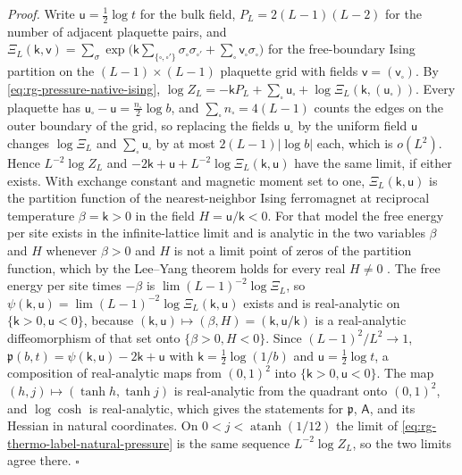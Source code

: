 \noindent\emph{Proof.}
Write $\mathsf u=\tfrac12\log t$ for the bulk field, $P_L=2(L-1)(L-2)$ for
the number of adjacent plaquette pairs, and
$\Xi_L(\mathsf k,\mathsf v)=\sum_\sigma\exp\bigl(\mathsf k\sum_{\{\square,\square'\}}
\sigma_\square\sigma_{\square'}+\sum_\square\mathsf v_\square\sigma_\square\bigr)$
for the free-boundary Ising partition on the $(L-1)\times(L-1)$ plaquette
grid with fields $\mathsf v=(\mathsf v_\square)$. By
\cref{eq:rg-pressure-native-ising},
$\log Z_L=-\mathsf kP_L+\sum_\square\mathsf u_\square+\log\Xi_L(\mathsf k,(\mathsf u_\square))$.
Every plaquette has $\mathsf u_\square-\mathsf u=\tfrac{n_\square}{2}\log b$,
and $\sum_\square n_\square=4(L-1)$ counts the edges on the outer boundary
of the grid, so replacing the fields $\mathsf u_\square$ by the uniform
field $\mathsf u$ changes $\log\Xi_L$ and $\sum_\square\mathsf u_\square$ by at
most $2(L-1)\lvert\log b\rvert$ each, which is $o(L^2)$. Hence
$L^{-2}\log Z_L$ and
$-2\mathsf k+\mathsf u+L^{-2}\log\Xi_L(\mathsf k,\mathsf u)$ have the same
limit, if either exists. With exchange constant and magnetic moment set to
one, $\Xi_L(\mathsf k,\mathsf u)$ is the partition function of the
nearest-neighbor Ising ferromagnet at reciprocal temperature
$\beta=\mathsf k>0$ in the field $H=\mathsf u/\mathsf k<0$. For that model the
free energy per site exists in the infinite-lattice limit and is analytic
in the two variables $\beta$ and $H$ whenever $\beta>0$ and $H$ is not a
limit point of zeros of the partition function, which by the Lee--Yang
theorem holds for every real $H\neq0$
\citep[abstract and Section~IV]{LebowitzPenrose1968}. The free energy per
site times $-\beta$ is $\lim(L-1)^{-2}\log\Xi_L$, so
$\psi(\mathsf k,\mathsf u)=\lim(L-1)^{-2}\log\Xi_L(\mathsf k,\mathsf u)$
exists and is real-analytic on $\{\mathsf k>0,\mathsf u<0\}$, because
$(\mathsf k,\mathsf u)\mapsto(\beta,H)=(\mathsf k,\mathsf u/\mathsf k)$ is a
real-analytic diffeomorphism of that set onto $\{\beta>0,H<0\}$. Since
$(L-1)^2/L^2\to1$, $\mathfrak p(b,t)=\psi(\mathsf k,\mathsf u)-2\mathsf k+\mathsf u$
with $\mathsf k=\tfrac12\log(1/b)$ and $\mathsf u=\tfrac12\log t$, a
composition of real-analytic maps from $(0,1)^2$ into $\{\mathsf k>0,\mathsf
u<0\}$. The map $(h,j)\mapsto(\tanh h,\tanh j)$ is real-analytic from the
quadrant onto $(0,1)^2$, and $\log\cosh$ is real-analytic, which gives the
statements for $\mathfrak p$, $\mathsf A$, and its Hessian in natural
coordinates. On $0<j<\operatorname{atanh}(1/12)$ the limit of
\cref{eq:rg-thermo-label-natural-pressure} is the same sequence
$L^{-2}\log Z_L$, so the two limits agree there. $\square$

